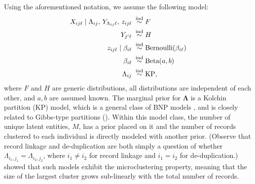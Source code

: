 \documentclass[11pt]{article}
\begin{document}
Using the aforementioned notation, we assume the following model:
\begin{align}
X_{ij\ell}\mid \Lambda_{ij},\,Y_{\Lambda_{ij}\ell},\,z_{ij\ell}\;& \stackrel{\text{ind}}{\sim} F \notag\\
Y_{j'\ell}\;&\stackrel{\text{ind}}{\sim}H \notag \\
z_{ij\ell}\mid\beta_{i\ell}\;&\stackrel{\text{ind}}{\sim}\text{Bernoulli}(\beta_{i\ell}) \notag\\
\beta_{i\ell}\;&\stackrel{\text{ind}}{\sim}\text{Beta}(a,b) \notag \\
\Lambda_{ij}\;&\stackrel{\text{ind}}{\sim}\text{KP}, \label{model:string}
\end{align}
where $F$ and $H$ are generic distributions, all distributions are independent of each other, and $a,b$ are assumed known.  The marginal prior for $\bm \Lambda$ is a Kolchin partition (KP) model, which is a general class of BNP models \citep{zanella2016microclustering}, and is closely related to Gibbs-type partitions (\cite[theorem 1.2]{pitman06combinatorial}). Within this model class, the number of unique latent entities, $M$, has a prior placed on it and the number of records clustered to each individual is directly modeled with another prior.  (Observe that record linkage and de-duplication are both simply a question of whether $\Lambda_{i_1,j_1}=\Lambda_{i_2,j_2}$, where $i_1\ne i_2$ for record linkage and $i_1=i_2$ for de-duplication.) \citep{zanella2016microclustering} showed that such models exhibit the microclustering property, meaning that 
 the size of the largest cluster grows sub-linearly with the total number of records. 
 
\end{document}
